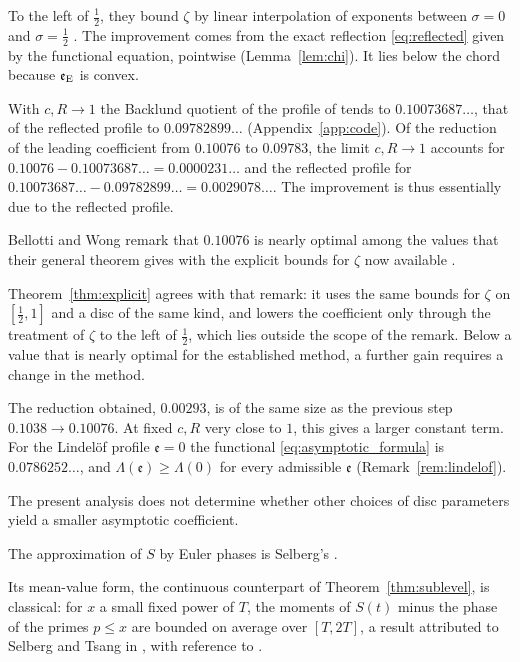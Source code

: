 \documentclass[11pt,a4paper]{article}
\makeatletter
\numberwithin{equation}{section}
\DeclareRobustCommand{\CGref}[1]{\ref{#1}}
\DeclareRobustCommand{\CGeqref}[1]{\eqref{#1}}
\DeclareRobustCommand{\CGcite}[2][]{\if\relax\detokenize{#1}\relax\cite{#2}\else\cite[#1]{#2}\fi}
\let\CG@origref\ref
\let\CG@origeqref\eqref
\newcommand{\CG@gettip}[1]{\@ifundefined{CGTip@#1}{#1}{\csname CGTip@#1\endcsname}}
\newcommand{\CG@getbib}[1]{\@ifundefined{CGBib@#1}{#1}{\csname CGBib@#1\endcsname}}
\DeclareRobustCommand{\CGref}[1]{\pdftooltip{\CG@origref{#1}}{\CG@gettip{#1}}}
\DeclareRobustCommand{\CGeqref}[1]{\pdftooltip{\CG@origeqref{#1}}{\CG@gettip{#1}}}
\DeclareRobustCommand{\CGcite}[2][]{\pdftooltip{\if\relax\detokenize{#1}\relax\cite{#2}\else\cite[#1]{#2}\fi}{\CG@getbib{#2}}}
\theoremstyle{definition}
\theoremstyle{remark}
\newcommand{\eE}{\mathfrak e_{\rm E}}
\makeatother
\begin{document}
To the left of $\frac12$, they bound $\zeta$ by linear interpolation of exponents between $\sigma=0$ and $\sigma=\frac12$ \CGcite[\S3.1]{BellottiWong2025}. The improvement comes from the exact reflection \CGeqref{eq:reflected} given by the functional equation, pointwise (Lemma~\CGref{lem:chi}). It lies below the chord because $\eE$ is convex.

\par
With $c,R\to1$ the Backlund quotient of the profile of \CGcite{BellottiWong2025} tends to $0.10073687\ldots$, that of the reflected profile to $0.09782899\ldots$ (Appendix~\CGref{app:code}). Of the reduction of the leading coefficient from $0.10076$ to $0.09783$, the limit $c,R\to1$ accounts for $0.10076-0.10073687\ldots=0.0000231\ldots$ and the reflected profile for $0.10073687\ldots-0.09782899\ldots=0.0029078\ldots$. The improvement is thus essentially due to the reflected profile.

Bellotti and Wong remark that $0.10076$ is nearly optimal among the values that their general theorem gives with the explicit bounds for $\zeta$ now available \CGcite[\S1]{BellottiWong2025}.

Theorem~\CGref{thm:explicit} agrees with that remark: it uses the same bounds for $\zeta$ on $[\frac12,1]$ and a disc of the same kind, and lowers the coefficient only through the treatment of $\zeta$ to the left of $\frac12$, which lies outside the scope of the remark. Below a value that is nearly optimal for the established method, a further gain requires a change in the method.

The reduction obtained, $0.00293$, is of the same size as the previous step $0.1038\to0.10076$. At fixed $c,R$ very close to $1$, this gives a larger constant term. For the Lindel\"of profile $\mathfrak e=0$ the functional \CGeqref{eq:asymptotic_formula} is $0.0786252\ldots$, and $\Lambda(\mathfrak e)\ge\Lambda(0)$ for every admissible $\mathfrak e$ (Remark~\CGref{rem:lindelof}).

The present analysis does not determine whether other choices of disc parameters yield a smaller asymptotic coefficient.

The approximation of $S$ by Euler phases is Selberg's \CGcite{Selberg1946a}.

Its mean-value form, the continuous counterpart of Theorem~\CGref{thm:sublevel}, is classical: for $x$ a small fixed power of $T$, the moments of $S(t)$ minus the phase of the primes $p\le x$ are bounded on average over $[T,2T]$, a result attributed to Selberg and Tsang in \CGcite[\S3, before (3.6)]{FazzariGerspachMinelli2025}, with reference to \CGcite[Thm.~5.1]{Tsang1984}.
\end{document}

